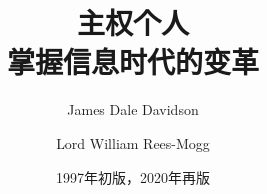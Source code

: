 \documentclass[11pt,a4paper]{ctexbook}%
\begin{document}
\title{\Huge{\textbf{主权个人}}\\ \large{掌握信息时代的变革}}
\author{James Dale Davidson
	\and Lord William Rees-Mogg}
\date{1997年初版，2020年再版}



\maketitle
\thispagestyle{empty} 	%

\pagestyle{empty}


\renewcommand\contentsname{目录} %
\tableofcontents %
\pagestyle{empty} %

\newpage
\mainmatter
\pagestyle{headings} %
\end{document}
